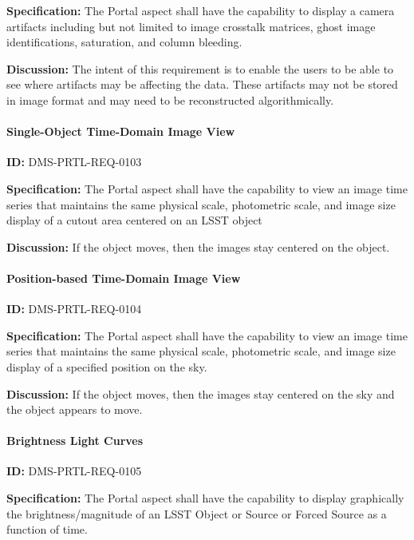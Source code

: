 \documentclass[SE,toc,lsstdraft]{lsstdoc}
\begin{document}
\textbf{Specification:}
The Portal aspect shall have the capability to display a camera artifacts including but not limited to image crosstalk matrices, ghost image identifications, saturation, and column bleeding.

\textbf{Discussion:}
The intent of this requirement is to enable the users to be able to see where artifacts may be affecting the data. These artifacts may not be stored in image format and may need to be reconstructed algorithmically.

\paragraph{Single-Object Time-Domain Image View}\hfill  %

\label{DMS-PRTL-REQ-0103}
\textbf{ID:} DMS-PRTL-REQ-0103

\textbf{Specification:}
The Portal aspect shall have the capability to view an image time series that maintains the same physical scale, photometric scale, and image size display of a cutout area centered on an LSST object

\textbf{Discussion:}
If the object moves, then the images stay centered on the object.

\paragraph{Position-based Time-Domain Image View}\hfill  %

\label{DMS-PRTL-REQ-0104}
\textbf{ID:} DMS-PRTL-REQ-0104

\textbf{Specification:}
The Portal aspect shall have the capability to view an image time series that maintains the same physical scale, photometric scale, and image size display of a specified position on the sky.

\textbf{Discussion:}
If the object moves, then the images stay centered on the sky and the object appears to move.

\paragraph{Brightness Light Curves}\hfill  %

\label{DMS-PRTL-REQ-0105}
\textbf{ID:} DMS-PRTL-REQ-0105

\textbf{Specification:}
The Portal aspect shall have the capability to display graphically the brightness/magnitude of an LSST Object or Source or Forced Source as a function of time.
\end{document}
